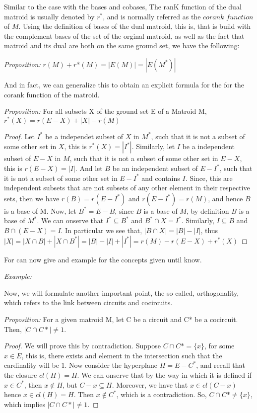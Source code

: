 Similar to the case with the bases and cobases, The ranK function of the dual matroid is usually denoted by $r^*$, and is normally referred as the $corank$ $function$ of $M$. Using the definition of bases of the dual matroid, this is, that is build with the complement bases of the set of the orginal matroid, as well as the fact that matroid and its dual are both on the same ground set, we have the following:

\textit{Proposition:} $r(M) + r$*$(M) = |E(M)|=|E(M^*)|$

And in fact, we can generalize this to obtain an explicit formula for the for the corank function of the matroid. 

\textit{Proposition:} For all subsets X of the ground set E of a Matroid M,\\
$r^*(X)=r(E-X)+|X|-r(M)$

\begin{proof}
    Let $I^*$ be a independet subset of $X$ in $M^*$, such that it is not a subset of some other set in $X$, this is $r^*(X)=|I^*|$. Similarly, let $I$ be a independent subset of $E-X$ in $M$, such that it is not a subset of some other set in $E-X$, this is $r(E-X)=|I|$. And let $B$ be an independent subset of $E-I^*$, such that it is not a subset of some other set in $E-I^*$ and contains $I$. Since, this are independent subsets that are not subsets of any other element in their respective sets, then we have $r(B)=r(E-I^*)$ and $r(E-I^*)=r(M)$, and hence $B$ is a base of M.
    Now, let $B^*=E-B$, since $B$ is a base of $M$, by definition $B$ is a base of $M^*$. We can onserve that $I^*\subseteq B^*$ and  $B^*\cap X=I^*$. Similarly, $I\subseteq B$ and  $B\cap (E-X)=I$. In particular we see that, $|B\cap X|=|B|-|I|$, thus
    $|X|=|X\cap B|+|X\cap B^*|=|B|-|I|+|I^*|=r(M)-r(E-X)+r^*(X)$
\end{proof}

For can now give and example for the concepts given until know.

\textit{Example:}




Now, we will formulate another important point, the so called, orthogonality, which refers to the link between circuits and cocircuits. 

\textit{Proposition:} For a given matroid M, let C be a circuit and C* be a cocircuit. Then,  
$|C \cap C*| \neq 1$.

\begin{proof}
    We will prove this by contradiction. Suppose $C \cap C* = \{x\}$, for some $x \in E$, this is, there exists and element in the intersection such that the cardinality will be 1. Now consider the hyperplane $H=E-C^*$, and recall that the closure $cl(H)=H$. We can onserve that by the way in which it is defined if $x\in C^*$, then $x\notin H$, but $C-x\subseteq H$. Moreover, we have that $x\in cl(C-x)$ hence $x\in cl(H)=H$. Then $x\notin C^*$, which is a contradiction. So, $C \cap C* \neq \{x\}$, which implies $|C \cap C*| \neq 1$.
\end{proof}

